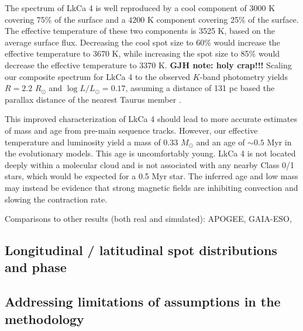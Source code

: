 \documentclass[twocolumn]{emulateapj}%
\begin{document}
The spectrum of LkCa 4 is well reproduced by a cool component of $3000$ K covering 75\% of the surface and a $4200$ K component covering 25\% of the surface.  The effective temperature of these two components is 3525 K, based on the average surface flux.  Decreasing the cool spot size to 60\% would increase the effective temperature to 3670 K, while increasing the spot size to 85\% would decrease the effective temperature to 3370 K.  {\bf GJH note:  holy crap!!!}  Scaling our composite spectrum for LkCa 4 to the observed $K$-band photometry yields $R=2.2$ $R_\odot$ and $\log L/L_\odot=0.17$, assuming a distance of 131 pc based the parallax distance of the nearest Taurus member \citep{torres12}.

This improved characterization of LkCa 4 should lead to more accurate estimates of mass and age from pre-main sequence tracks.  However, our effective temperature and luminosity yield a mass of 0.33 $M_\odot$ and an age of $\sim 0.5$ Myr in the \citet{baraffe15} evolutionary models.  This age is uncomfortably young.  LkCa 4 is not located deeply within a molecular cloud and is not associated with any nearby Class 0/1 stars, which would be expected for a 0.5 Myr star.  The inferred age and low mass may instead be evidence that strong magnetic fields are inhibiting convection and slowing the contraction rate.


Comparisons to other results (both real and simulated):  APOGEE, GAIA-ESO, 



\subsection{Longitudinal / latitudinal spot distributions and phase}



\subsection{Addressing limitations of assumptions in the methodology}
\end{document}
